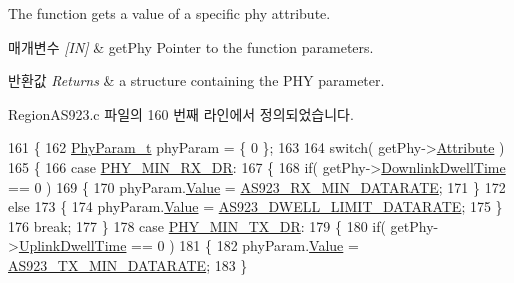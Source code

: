 The function gets a value of a specific phy attribute. 


\begin{DoxyParams}{매개변수}
{\em \mbox{[}\+I\+N\mbox{]}} & get\+Phy Pointer to the function parameters.\\
\hline
\end{DoxyParams}

\begin{DoxyRetVals}{반환값}
{\em Returns} & a structure containing the P\+HY parameter. \\
\hline
\end{DoxyRetVals}


Region\+A\+S923.\+c 파일의 160 번째 라인에서 정의되었습니다.


\begin{DoxyCode}
161 \{
162     \mbox{\hyperlink{unionu_phy_param}{PhyParam\_t}} phyParam = \{ 0 \};
163 
164     \textcolor{keywordflow}{switch}( getPhy->\mbox{\hyperlink{structs_get_phy_params_abdcb168ffd6913b85e2f635d7a475f2d}{Attribute}} )
165     \{
166         \textcolor{keywordflow}{case} \mbox{\hyperlink{group___r_e_g_i_o_n_gga51cbe8f5433d914fe9cf81b451de2c2da91cb5d84f937c32cd635dd7efe7a9d3a}{PHY\_MIN\_RX\_DR}}:
167         \{
168             \textcolor{keywordflow}{if}( getPhy->\mbox{\hyperlink{structs_get_phy_params_a63074ce7d23ff98956f5d6f4054f235f}{DownlinkDwellTime}} == 0 )
169             \{
170                 phyParam.\mbox{\hyperlink{unionu_phy_param_a8e0dcce3428a8051614e852b8836d0d1}{Value}} = \mbox{\hyperlink{group___r_e_g_i_o_n_a_s923_ga55aa4a1054571ef315043248599e1c96}{AS923\_RX\_MIN\_DATARATE}};
171             \}
172             \textcolor{keywordflow}{else}
173             \{
174                 phyParam.\mbox{\hyperlink{unionu_phy_param_a8e0dcce3428a8051614e852b8836d0d1}{Value}} = \mbox{\hyperlink{group___r_e_g_i_o_n_a_s923_gab4d42ec6203089aa346cd55d90eb769e}{AS923\_DWELL\_LIMIT\_DATARATE}};
175             \}
176             \textcolor{keywordflow}{break};
177         \}
178         \textcolor{keywordflow}{case} \mbox{\hyperlink{group___r_e_g_i_o_n_gga51cbe8f5433d914fe9cf81b451de2c2daace3e56c88b40def8ed6a9106871e7de}{PHY\_MIN\_TX\_DR}}:
179         \{
180             \textcolor{keywordflow}{if}( getPhy->\mbox{\hyperlink{structs_get_phy_params_a0e6663762d6f9173bc8d8cb018f8f17a}{UplinkDwellTime}} == 0 )
181             \{
182                 phyParam.\mbox{\hyperlink{unionu_phy_param_a8e0dcce3428a8051614e852b8836d0d1}{Value}} = \mbox{\hyperlink{group___r_e_g_i_o_n_a_s923_gab6f2badbf9a4eb4038301759c0f7fc77}{AS923\_TX\_MIN\_DATARATE}};
183             \}

\end{DoxyCode}
